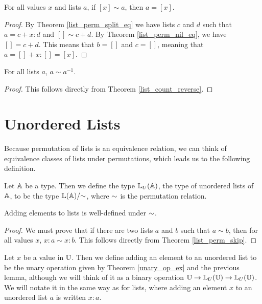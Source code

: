 \documentclass[../math.tex]{subfiles}
\begin{document}
\begin{theorem} \label{list_perm_single}
    For all values $x$ and lists $a$, if $[x] \sim a$, then $a = [x]$.
\end{theorem}
\begin{proof}
    By Theorem \ref{list_perm_split_eq} we have lists $c$ and $d$ such that $a =
    c + x : d$ and $[] \sim c + d$.  By Theorem \ref{list_perm_nil_eq}, we have
    $[] = c + d$.  This means that $b = []$ and $c = []$,  meaning that $a = []
    + x : [] = [x]$.
\end{proof}

\begin{theorem} \label{list_perm_reverse}
    For all lists $a$, $a \sim a^{-1}$.
\end{theorem}
\begin{proof}
    This follows directly from Theorem \ref{list_count_reverse}.
\end{proof}

\section{Unordered Lists}

Because permutation of lists is an equivalence relation, we can think of
equivalence classes of lists under permutations, which leads us to the following
definition.

\begin{definition}
    Let $\mathbb{A}$ be a type.  Then we define the type $\mathbb{L}_U(\mathbb{A})$, the type of
    unordered lists of $\mathbb{A}$, to be the type  $\mathbb{L}(\mathbb{A})/{\sim}$, where ${\sim}$ is
    the permutation relation.
\end{definition}

\begin{lemma}
    Adding elements to lists is well-defined under ${\sim}$.
\end{lemma}
\begin{proof}
    We must prove that if there are two lists $a$ and $b$ such that $a \sim b$,
    then for all values $x$, $x : a \sim x : b$.  This follows directly from
    Theorem \ref{list_perm_skip}.
\end{proof}

\begin{definition}
    Let $x$ be a value in $\mathbb{U}$.  Then we define adding an element to an
    unordered list to be the unary operation given by Theorem \ref{unary_op_ex}
    and the previous lemma, although we will think of it as a binary operation
    $\mathbb{U} \to \mathbb{L}_U(\mathbb{U}) \to \mathbb{L}_U(\mathbb{U})$.  We will notate it in the same way as for
    lists, where adding an element $x$ to an unordered list $a$ is written $x :
    a$.
\end{definition}
\end{document}
